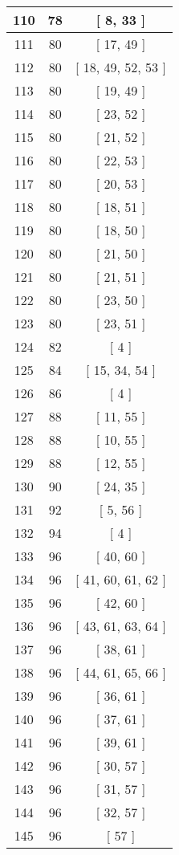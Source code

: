 \begin{center}
\begin{longtable}[H]{|| c c c ||}
\hline
110 & 78 & [ 8, 33 ] \\ 
\hline
111 & 80 & [ 17, 49 ] \\ 
\hline
112 & 80 & [ 18, 49, 52, 53 ] \\ 
\hline
113 & 80 & [ 19, 49 ] \\ 
\hline
114 & 80 & [ 23, 52 ] \\ 
\hline
115 & 80 & [ 21, 52 ] \\ 
\hline
116 & 80 & [ 22, 53 ] \\ 
\hline
117 & 80 & [ 20, 53 ] \\ 
\hline
118 & 80 & [ 18, 51 ] \\ 
\hline
119 & 80 & [ 18, 50 ] \\ 
\hline
120 & 80 & [ 21, 50 ] \\ 
\hline
121 & 80 & [ 21, 51 ] \\ 
\hline
122 & 80 & [ 23, 50 ] \\ 
\hline
123 & 80 & [ 23, 51 ] \\ 
\hline
124 & 82 & [ 4 ] \\ 
\hline
125 & 84 & [ 15, 34, 54 ] \\ 
\hline
126 & 86 & [ 4 ] \\ 
\hline
127 & 88 & [ 11, 55 ] \\ 
\hline
128 & 88 & [ 10, 55 ] \\ 
\hline
129 & 88 & [ 12, 55 ] \\ 
\hline
130 & 90 & [ 24, 35 ] \\ 
\hline
131 & 92 & [ 5, 56 ] \\ 
\hline
132 & 94 & [ 4 ] \\ 
\hline
133 & 96 & [ 40, 60 ] \\ 
\hline
134 & 96 & [ 41, 60, 61, 62 ] \\ 
\hline
135 & 96 & [ 42, 60 ] \\ 
\hline
136 & 96 & [ 43, 61, 63, 64 ] \\ 
\hline
137 & 96 & [ 38, 61 ] \\ 
\hline
138 & 96 & [ 44, 61, 65, 66 ] \\ 
\hline
139 & 96 & [ 36, 61 ] \\ 
\hline
140 & 96 & [ 37, 61 ] \\ 
\hline
141 & 96 & [ 39, 61 ] \\ 
\hline
142 & 96 & [ 30, 57 ] \\ 
\hline
143 & 96 & [ 31, 57 ] \\ 
\hline
144 & 96 & [ 32, 57 ] \\ 
\hline
145 & 96 & [ 57 ] \\ 

\end{longtable}
\end{center}
